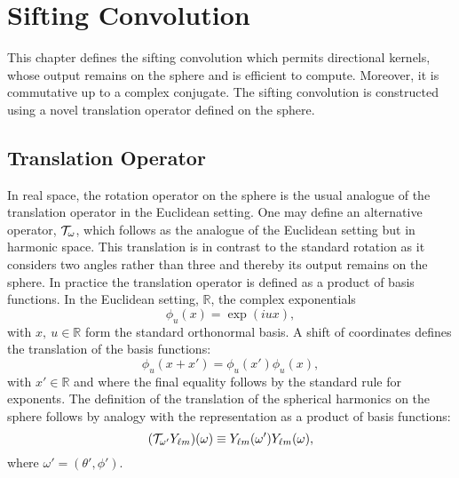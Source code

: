 

\section{Sifting Convolution}\label{sec:chapter3_sifting_convolution}

This chapter defines the sifting convolution which permits directional kernels, whose output remains on the sphere and is efficient to compute.
Moreover, it is commutative up to a complex conjugate.
The sifting convolution is constructed using a novel translation operator defined on the sphere.

\subsection{Translation Operator}\label{sec:chapter3_translation_operator}

In real space, the rotation operator on the sphere is the usual analogue of the translation operator in the Euclidean setting.
One may define an alternative operator, \(\translation{\omega}\), which follows as the analogue of the Euclidean setting but in harmonic space.
This translation is in contrast to the standard rotation as it considers two angles rather than three and thereby its output remains on the sphere.
In practice the translation operator is defined as a product of basis functions.
In the Euclidean setting, \eg{} \(\mathbb{R}\), the complex exponentials
%
\begin{equation}\label{eq:chapter3_complex_exponentials}
	\phi_{u}(x)
	= \exp(i u x),
\end{equation}
%
with \(x,\ u \in \mathbb{R}\) form the standard orthonormal basis.
A shift of coordinates defines the translation of the basis functions:
%
\begin{equation}\label{eq:chapter3_exponentials_shift}
	\phi_{u}(x + x')
	= \phi_{u}(x') \phi_{u}(x),
\end{equation}
%
with \(x' \in \mathbb{R}\) and where the final equality follows by the standard rule for exponents.
The definition of the translation of the spherical harmonics on the sphere follows by analogy with the representation as a product of basis functions:
%
\begin{equation}\label{eq:chapter3_translation_basis_functions}
	\pixel{(\translation{\omega'}\harmonic{Y})}
	\equiv \pixel[']{\harmonic{Y}} \pixel{\harmonic{Y}},
\end{equation}
%
where \(\omega'=(\theta',\phi')\).

